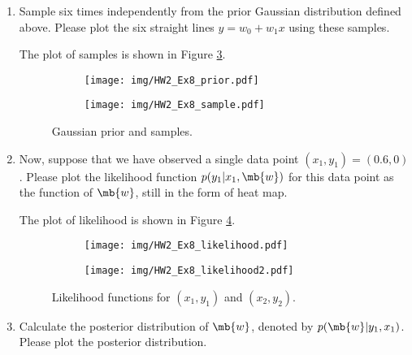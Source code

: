 \begin{exercise}
\begin{enumerate}
        \item Sample six times independently from the prior Gaussian distribution defined above. Please plot the six straight lines $y=w_0+w_1x$ using these samples.
            \begin{solution}
                The plot of samples is shown in Figure \ref{fig:prior-sample}.
                \qedhere
                \begin{figure}[H]
                    \centering
                    \begin{subfigure}{0.5\textwidth}
                        \texttt{[image: img/HW2\_Ex8\_prior.pdf]}
                        \label{fig:gaussian-prior}
                    \end{subfigure}
                    \hfill
                    \begin{subfigure}{0.45\textwidth}
                        \texttt{[image: img/HW2\_Ex8\_sample.pdf]}
                        \label{fig:prior-sample}
                    \end{subfigure}
                    \caption{Gaussian prior and samples.}
                \end{figure}
            \end{solution}
        \item Now, suppose that we have observed a single data point $(x_1,y_1)=(0.6,0)$.  Please plot the likelihood function $p(y_1|x_1,\mb{w})$ for this data point as the function of $\mb{w}$, still in the form of heat map.
            \begin{solution}
                The plot of likelihood is shown in Figure \ref{fig:likelihood1}.
                \qedhere
                \begin{figure}[H]
                    \centering
                    \begin{subfigure}{0.49\textwidth}
                        \texttt{[image: img/HW2\_Ex8\_likelihood.pdf]}
                        \label{fig:likelihood1}
                    \end{subfigure}
                    \hfill
                    \begin{subfigure}{0.49\textwidth}
                        \texttt{[image: img/HW2\_Ex8\_likelihood2.pdf]}
                        \label{fig:likelihood2}
                    \end{subfigure}
                    \caption{Likelihood functions for $(x_1,y_1)$ and $(x_2,y_2)$.}
                \end{figure}
            \end{solution}
        \item Calculate the posterior distribution of $\mb{w}$, denoted by $p(\mb{w}|y_1,x_1)$.
            Please plot the posterior distribution.
            

\end{enumerate}
\end{exercise}
